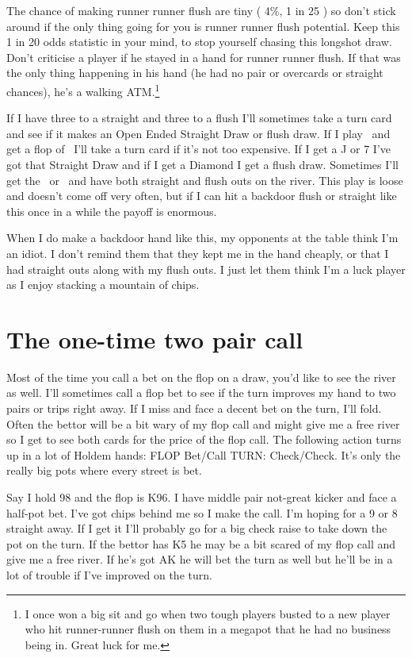 The chance of making runner runner flush are tiny ( 4\%, 1 in 25 )
so don't stick around if the only thing going for you is runner
runner flush potential. Keep this 1 in 20 odds statistic in your
mind, to stop yourself chasing this longshot draw.
Don't criticise a player if he stayed in a hand for runner
runner flush. If that was the only thing happening in his hand
(he had no pair or overcards or straight chances), he's a walking
ATM.\footnote{I once won a big sit and go when two tough players
busted to a new player who hit runner-runner flush on them
in a megapot that he had no business being in. Great luck for me.}

If I have three to a straight and three to a flush I'll sometimes
take a turn card and see if it makes an Open Ended Straight Draw or
flush draw. If I play \tend\nined\ and get a flop of \Ah\eigd\twoc\ I'll take a
turn card if it's not too expensive. If I get a J or 7 I've got
that Straight Draw and if I get a Diamond I get a flush draw.
Sometimes I'll get the \Jd\ or \sevd\ and have both straight
and flush outs on the river. This play is loose and doesn't
come off very often, but if I can hit a backdoor flush or straight
like this once in a while the payoff is enormous.

When I do make a backdoor hand like this, my opponents at the table
think I'm an idiot. I don't remind them that they kept me in
the hand cheaply, or that I had straight outs along with my flush
outs. I just let them think I'm a luck player as I enjoy stacking a
mountain of chips.

\section{The one-time two pair call}

Most of the time you call a bet on the flop on a draw, you'd like to
see the river as well. I'll sometimes call a flop bet to see if the
turn improves my hand to two pairs or trips right away.
If I miss and face a decent bet on the turn, I'll fold.
Often the bettor will be a bit wary of my flop call and might
give me a free river so I get to see both cards for the price of the
flop call. The following action turns up in a lot of Holdem hands:
FLOP Bet/Call TURN: Check/Check. It's only the really big pots where
every street is bet.

Say I hold 98 and the flop is K96. I have middle pair not-great
kicker and face a half-pot bet. I've got chips behind me so I make
the call. I'm hoping for a 9 or 8 straight away. If I get it I'll
probably go for a big check raise to take down the pot on the turn. If
the bettor has K5 he may be a bit scared of my flop call and give
me a free river. If he's got AK he will bet the turn as well but he'll
be in a lot of trouble if I've improved on the turn.

